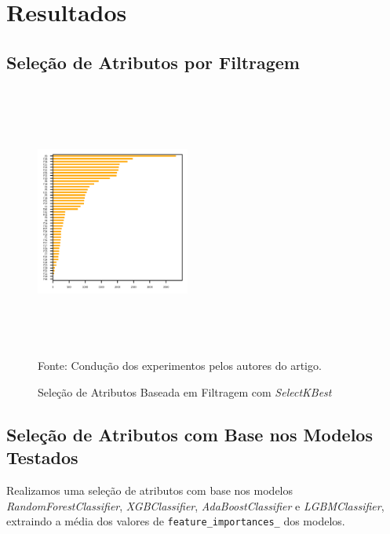 \section{Resultados}

\subsection{Seleção de Atributos por Filtragem}

\begin{figure}[h]
\centering
\caption{\label{figure:figura1}Seleção de Atributos Baseada em Filtragem com \textit{SelectKBest} \cite{b5}}
  \includegraphics[width=0.45\textwidth,height=90mm]{assets/selectkbest.png}
  \\ Fonte: Condução dos experimentos pelos autores do artigo.
\end{figure}

\subsection{Seleção de Atributos com Base nos Modelos Testados}

Realizamos uma seleção de atributos com base nos modelos \textit{RandomForestClassifier}, \textit{XGBClassifier}, \textit{AdaBoostClassifier} e \textit{LGBMClassifier}, extraindo a média dos valores de \texttt{\footnotesize{feature\_importances\_}} dos modelos.

